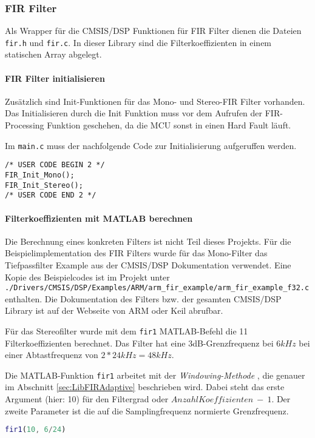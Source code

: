 \subsubsection{FIR Filter}
\label{sec:LibFIRFilter}

Als Wrapper für die CMSIS/DSP Funktionen für FIR Filter dienen die Dateien \texttt{fir.h} und \texttt{fir.c}. In dieser Library sind die Filterkoeffizienten in einem statischen Array abgelegt.


\paragraph{FIR Filter initialisieren}

Zusätzlich sind Init-Funktionen für das Mono- und Stereo-FIR Filter vorhanden. 
Das Initialisieren durch die Init Funktion muss vor dem Aufrufen der FIR-Processing Funktion geschehen, da die MCU sonst in einen Hard Fault läuft.

Im \texttt{main.c} muss der nachfolgende Code zur Initialisierung aufgeruffen werden.

\begin{lstlisting}[style=Cuvision, caption={Init Funktion der FIR Filter}]
/* USER CODE BEGIN 2 */
FIR_Init_Mono();
FIR_Init_Stereo();
/* USER CODE END 2 */
\end{lstlisting}


\paragraph{Filterkoeffizienten mit MATLAB berechnen}

Die Berechnung eines konkreten Filters ist nicht Teil dieses Projekts.
Für die Beispielimplementation des FIR Filters wurde für das Mono-Filter das Tiefpassfilter Example aus der CMSIS/DSP Dokumentation verwendet. 
Eine Kopie des Beispielcodes ist im Projekt unter \\
\texttt{./Drivers/CMSIS/DSP/Examples/ARM/arm\_fir\_example/arm\_fir\_example\_f32.c} enthalten.
Die Dokumentation des Filters bzw. der gesamten CMSIS/DSP Library ist auf der Webseite von ARM \cite{cmsis-doc-arm} oder Keil \cite{cmsis-doc-keil} abrufbar.

Für das Stereofilter wurde mit dem \texttt{fir1} MATLAB-Befehl die 11 Filterkoeffizienten berechnet. Das Filter hat eine 3dB-Grenzfrequenz bei $6\si{kHz}$ bei einer Abtastfrequenz von $2*24\si{kHz}=48\si{kHz}$.

Die MATLAB-Funktion \texttt{fir1} arbeitet mit der \textit{Windowing-Methode} \cite{FIR-Windowing}, die genauer im Abschnitt \ref{sec:LibFIRAdaptive} beschrieben wird.
Dabei steht das erste Argument (hier: 10) für den Filtergrad oder $Anzahl Koeffizienten\ -\ 1$. Der zweite Parameter ist die auf die Samplingfrequenz normierte Grenzfrequenz.

\begin{lstlisting}[language=matlab]
fir1(10, 6/24)
\end{lstlisting}


